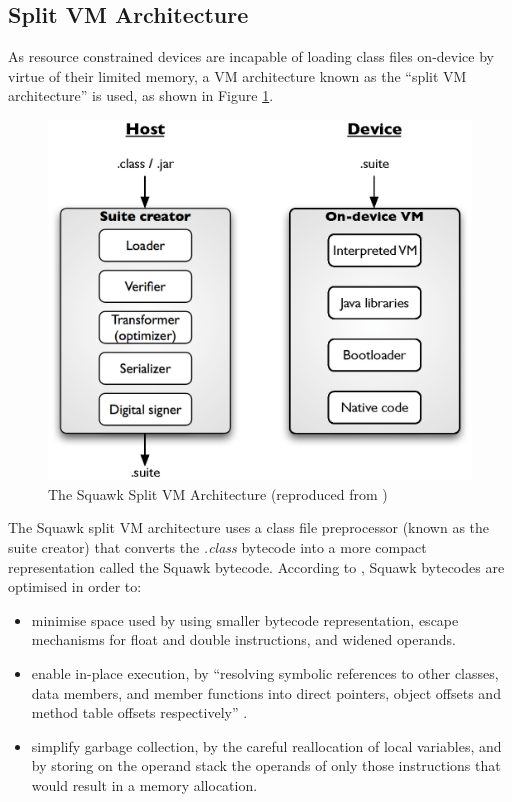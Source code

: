 \subsection{Split VM Architecture}

As resource constrained devices are incapable of loading class files on-device
by virtue of their limited memory, a VM architecture known as the ``split VM
architecture'' is used, as shown in Figure
\ref{Fig:SquawkVM_architecture}.

\begin{figure}[h]
\centering
\includegraphics[scale=0.61]{img/Squawk_architecture.eps} 
\caption[The Squawk Split VM Architecture]{The Squawk
Split VM Architecture (reproduced from \cite{simon_squawk:2006})}
\label{Fig:SquawkVM_architecture}
\end{figure}  

The Squawk split VM architecture uses a class file preprocessor (known as the
suite creator) that converts the \emph{.class} bytecode into a more compact
representation called the Squawk bytecode. According to
\cite{simon_squawk:2006}, Squawk bytecodes are optimised in order to:
\begin{itemize}
\item minimise space used by using smaller bytecode representation, escape
mechanisms for float and double instructions, and widened operands. 
\item enable in-place execution, by ``resolving symbolic references to other
classes, data members, and member functions into direct pointers, object offsets
and method table offsets respectively'' \cite{simon_squawk:2006}.
\item simplify garbage collection, by the careful reallocation of local
variables, and by storing on the operand stack the operands of only those instructions that would result in a memory allocation.
\end{itemize}

